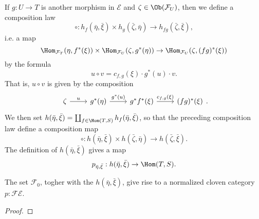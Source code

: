 If $g:U\to T$ is another morphism in $\mathcal{E}$ and $\zeta\in\Ob(\mathcal{F}_U)$, then we define a composition law
\[\circ:h_f(\bar{\eta},\bar{\xi})\times h_g(\bar{\zeta},\bar{\eta})\to h_{fg}(\bar{\zeta},\bar{\xi}),\]
i.e. a map
\[\Hom_{\mathcal{F}_T}(\eta,f^*(\xi))\times\Hom_{\mathcal{F}_U}(\zeta,g^*(\eta))\to \Hom_{\mathcal{F}_U}(\zeta,(fg)^*(\xi))\]
by the formula
\[u\circ v=c_{f,g}(\xi)\cdot g^*(u)\cdot v.\]
That is, $u\circ v$ is given by the composition
\[\begin{tikzcd}
\zeta\ar[r,"u"]&g^*(\eta)\ar[r,"g^*(u)"]&g^*f^*(\xi)\ar[r,"c_{f,g}(\xi)"]&(fg)^*(\xi)
\end{tikzcd}.\]
We then set $h(\bar{\eta},\bar{\xi})=\coprod_{f\in\Hom(T,S)}h_f(\bar{\eta},\bar{\xi})$, so that the preceding composition law define a composition map
\[\circ:h(\bar{\eta},\bar{\xi})\times h(\bar{\zeta},\bar{\eta})\to h(\bar{\zeta},\bar{\xi}).\]
The definition of $h(\bar{\eta},\bar{\xi})$ gives a map
\[p_{\bar{\eta},\bar{\xi}}:h(\bar{\eta},\bar{\xi})\to \Hom(T,S).\]
\begin{proposition}\label{fibre cat cloven given by pseudo-functor to Cat}
The set $\mathcal{F}_0$, togher with the $h(\bar{\eta},\bar{\xi})$, give rise to a normalized cloven category $p:\mathcal{F}\mathcal{E}$. 
\end{proposition}
\begin{proof}

\end{proof}
